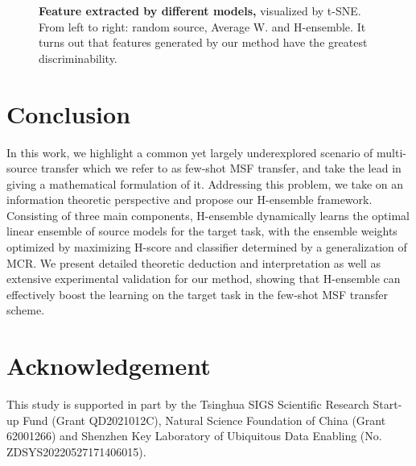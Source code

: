 \documentclass[letterpaper]{article} %
\begin{document}
\begin{figure}[!ht]
    \centering
    \centerline{}
    \caption{\textbf{Feature extracted by different models,} visualized by t-SNE. From left to right: random source, Average W. and H-ensemble. It turns out that features generated by our method have the greatest discriminability.
    }
    \label{fig:tsne}
\end{figure}













\section{Conclusion}



In this work, we highlight a common yet largely underexplored scenario of multi-source transfer which we refer to as few-shot MSF transfer, and take the lead in giving a mathematical formulation of it. Addressing this problem, we take on an information theoretic perspective and propose our H-ensemble framework. Consisting of three main components, H-ensemble dynamically learns the optimal linear ensemble of source models for the target task, with the ensemble weights optimized by maximizing H-score and classifier determined by a generalization of MCR. We present detailed theoretic deduction and interpretation as well as extensive experimental validation for our method, showing that H-ensemble can effectively boost the learning on the target task in the few-shot MSF transfer scheme.

\section{Acknowledgement}
This study is supported in part by the Tsinghua SIGS Scientific Research Start-up Fund (Grant QD2021012C), Natural Science Foundation of China (Grant 62001266) and Shenzhen Key Laboratory of Ubiquitous Data Enabling (No. ZDSYS20220527171406015).


\end{document}
